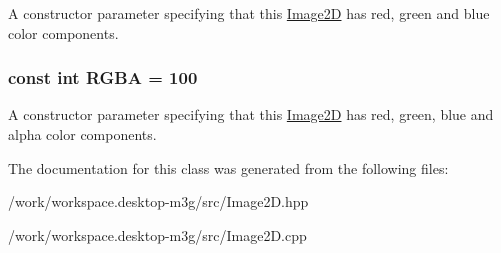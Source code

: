 A constructor parameter specifying that this \hyperlink{classm3g_1_1Image2D}{Image2D} has red, green and blue color components. \hypertarget{classm3g_1_1Image2D_0aaf9f2f4c064633c6d2888ec2c39e92}{
\subsubsection[{RGBA}]{\setlength{\rightskip}{0pt plus 5cm}const int {\bf RGBA} = 100}}
\label{classm3g_1_1Image2D_0aaf9f2f4c064633c6d2888ec2c39e92}


A constructor parameter specifying that this \hyperlink{classm3g_1_1Image2D}{Image2D} has red, green, blue and alpha color components. 

The documentation for this class was generated from the following files:\begin{CompactItemize}
\item 
/work/workspace.desktop-m3g/src/Image2D.hpp\item 
/work/workspace.desktop-m3g/src/Image2D.cpp\end{CompactItemize}
